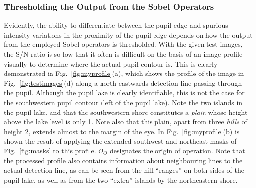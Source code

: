 \subsubsection{Thresholding the Output from the Sobel Operators}


Evidently, the ability to differentiate between the pupil edge and
spurious intensity variations in the proximity of the pupil edge
depends on how the output from the employed Sobel operators is
thresholded.  With the given test images, the S/N ratio is so low that
it often is difficult on the basis of an image profile visually to
determine where the actual pupil contour is.  This is clearly
demonstrated in Fig.~\ref{fig:myprofile}(a), which shows the profile
of the image in Fig.~\ref{fig:testimages}(d) along a north-eastwards
detection line passing through the pupil.  Although the pupil lake is
clearly identifiable, this is not the case for the southwestern pupil
contour (left of the pupil lake).  Note the two islands in the pupil
lake, and that the southwestern shore constitutes a {\em plain\/}
whose height above the lake level is only 1.  Note also that this
plain, apart from three {\em hills\/} of height 2, extends almost to
the margin of the eye.  In Fig.~\ref{fig:myprofile}(b) is shown the
result of applying the extended southwest and northeast masks of
Fig.~\ref{fig:masks} to this profile.  $O_{O}$ designates the origin
of operation.  Note that the processed profile also contains
information about neighbouring lines to the actual detection line, as
can be seen from the hill ``ranges'' on both sides of the pupil lake,
as well as from the two ``extra'' islands by the northeastern shore.

